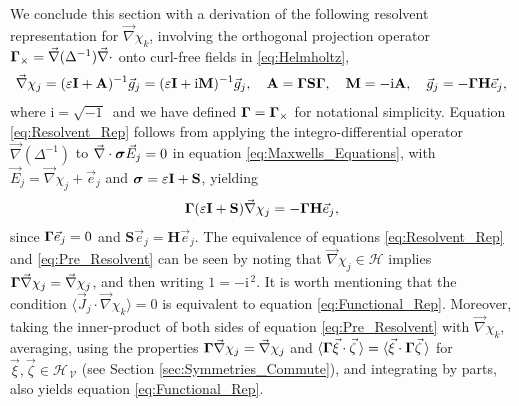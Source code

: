 \documentclass[11pt]{amsart}
\newcommand{\I}{\mathrm{i}}
\newcommand{\Mb}{\mathbf{M}}
\newcommand{\Hb}{\mathbf{H}}
\newcommand{\Ib}{\mathbf{I}}
\newcommand{\Sb}{\mathbf{S}}
\newcommand{\Ab}{\mathbf{A}}
\newcommand{\Vc}{\mathcal{V}}
\newcommand{\Hs}{\mathscr{H}}
\newcommand\bsig{\mbox{\boldmath${\sigma}$}}
\newcommand\bGamma{\mbox{\boldmath${\Gamma}$}}
\begin{document}
We conclude this section with a derivation of the following resolvent
representation for $\vec{\nabla}\chi_k$, involving the orthogonal projection
operator $\bGamma_\times=\vec{\nabla}(\Delta^{-1})\vec{\nabla}\cdot$ onto curl-free fields in
\eqref{eq:Helmholtz},  
\begin{align}\label{eq:Resolvent_Rep}
  \vec{\nabla}\chi_j=(\varepsilon\Ib+\Ab)^{-1}\vec{g}_j
           =(\varepsilon\Ib+\I\Mb)^{-1}\vec{g}_j, \quad
  \Ab=\bGamma\Sb\bGamma, \quad
  \Mb=-\I\Ab, \quad
  \vec{g}_j=-\bGamma\Hb\vec{e}_j,
\end{align}
%
where $\I=\sqrt{-1}\,$ and we have defined $\bGamma=\bGamma_\times$ for
notational simplicity. Equation \eqref{eq:Resolvent_Rep} follows from
applying the integro-differential operator $\vec{\nabla}(\Delta^{-1})$ to
$\vec{\nabla}\cdot\bsig\vec{E}_j=0$ in equation \eqref{eq:Maxwells_Equations},
with $\vec{E}_j=\vec{\nabla}\chi_j+\vec{e}_j$ and $\bsig=\varepsilon\Ib+\Sb$, yielding  
%
\begin{align}\label{eq:Pre_Resolvent}
  \bGamma(\varepsilon\Ib+\Sb)\vec{\nabla}\chi_j=-\bGamma\Hb\vec{e}_j,
\end{align}
%
since $\bGamma\vec{e}_j=0$ and $\Sb\vec{e}_j=\Hb\vec{e}_j$.
The equivalence of equations \eqref{eq:Resolvent_Rep} and
\eqref{eq:Pre_Resolvent} can be seen by noting that
$\vec{\nabla}\chi_j\in\Hs$ implies $\bGamma\vec{\nabla}\chi_j=\vec{\nabla}\chi_j$,
and then writing $1=-\I^{\,2}$. It is worth mentioning that the
condition $\langle\vec{J}_j\cdot\vec{\nabla}\chi_k\rangle=0$ is equivalent to equation
\eqref{eq:Functional_Rep}. Moreover, taking the inner-product of both
sides of equation \eqref{eq:Pre_Resolvent} with $\vec{\nabla}\chi_k$,
averaging, using the properties $\bGamma\vec{\nabla}\chi_j=\vec{\nabla}\chi_j$ and
$\langle\bGamma\vec{\xi}\cdot\vec{\zeta}\,\rangle=\langle\vec{\xi}\cdot\bGamma\vec{\zeta}\,\rangle$ for
$\vec{\xi},\vec{\zeta}\in\Hs_{\,\Vc}$ (see Section
\ref{sec:Symmetries_Commute}), and integrating by parts, also yields
equation  \eqref{eq:Functional_Rep}.     

\end{document}
